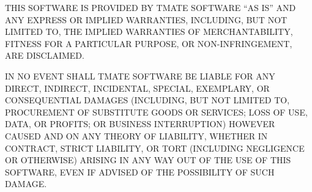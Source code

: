 \bigskip
\noindent THIS SOFTWARE IS PROVIDED BY TMATE SOFTWARE ``AS IS'' AND ANY EXPRESS OR IMPLIED
WARRANTIES, INCLUDING, BUT NOT LIMITED TO, THE IMPLIED WARRANTIES OF 
MERCHANTABILITY, FITNESS FOR A PARTICULAR PURPOSE, OR NON-INFRINGEMENT, ARE 
DISCLAIMED. 

\bigskip
\noindent IN NO EVENT SHALL TMATE SOFTWARE BE LIABLE FOR ANY DIRECT, INDIRECT, 
INCIDENTAL, SPECIAL, EXEMPLARY, OR CONSEQUENTIAL DAMAGES (INCLUDING, BUT NOT 
LIMITED TO, PROCUREMENT OF SUBSTITUTE GOODS OR SERVICES; LOSS OF USE, DATA, OR 
PROFITS; OR BUSINESS INTERRUPTION) HOWEVER CAUSED AND ON ANY THEORY OF 
LIABILITY, WHETHER IN CONTRACT, STRICT LIABILITY, OR TORT (INCLUDING NEGLIGENCE 
OR OTHERWISE) ARISING IN ANY WAY OUT OF THE USE OF THIS SOFTWARE, EVEN IF 
ADVISED OF THE POSSIBILITY OF SUCH DAMAGE.



